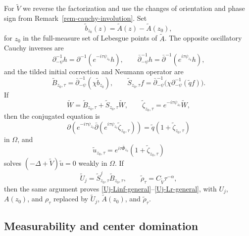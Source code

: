 \documentclass[a4paper,11pt]{article}
\theoremstyle{plain}
\theoremstyle{definition}
\theoremstyle{remark}
\begin{document}
For $\widetilde V$ we reverse the factorization and use the changes of orientation and phase sign from Remark~\ref{rem-cauchy-involution}.  Set
\begin{equation}
        \widetilde b_{z_0}(z)=\widetilde A(z)-\widetilde A(z_0),
\end{equation}
for $z_0$ in the full-measure set of Lebesgue points of $\widetilde A$.  The opposite oscillatory Cauchy inverses are
\begin{equation}
        \partial_{-\psi}^{-1}h=\partial^{-1}(e^{-i\tau\psi_{z_0}}h),
        \qquad
        \bar\partial_{-\psi}^{-1}h=\bar\partial^{-1}(e^{i\tau\psi_{z_0}}h),
\end{equation}
and the tilded initial correction and Neumann operator are
\begin{equation}\label{tilde-B-S-def-precise}
        \widetilde B_{z_0,\tau}=\bar\partial_{-\psi}^{-1}(\chi\widetilde b_{z_0}),
        \qquad
        \widetilde S_{z_0,\tau}f=\bar\partial_{-\psi}^{-1}\bigl(\chi\partial_{-\psi}^{-1}(\widetilde q f)\bigr).
\end{equation}
If
\begin{equation}
        \widetilde W=\widetilde B_{z_0,\tau}+\widetilde S_{z_0,\tau}\widetilde W,
        \qquad
        \widetilde\zeta_{z_0,\tau}=e^{-i\tau\psi_{z_0}}\widetilde W,
\end{equation}
then the conjugated equation is
\begin{equation}\label{tilde-conjugated-remainder-equation}
        \partial\left(e^{-i\tau\psi_{z_0}}\bar\partial(e^{i\tau\psi_{z_0}}\widetilde\zeta_{z_0,\tau})\right)
        =\widetilde q(1+\widetilde\zeta_{z_0,\tau})
\end{equation}
in $\Omega$, and
\begin{equation}
        \widetilde u_{z_0,\tau}=e^{i\tau\bar\Phi_{z_0}}(1+\widetilde\zeta_{z_0,\tau})
\end{equation}
solves $(-\Delta+\widetilde V)\widetilde u=0$ weakly in $\Omega$.  If
\begin{equation}
        \widetilde U_j=\widetilde S_{z_0,\tau}^j\widetilde B_{z_0,\tau},
        \qquad
        \widetilde\rho_\tau=C_{\widetilde V}\tau^{-\alpha},
\end{equation}
then the same argument proves \eqref{Uj-Linf-general}--\eqref{Uj-Lr-general}, with $U_j$, $A(z_0)$, and $\rho_\tau$ replaced by $\widetilde U_j$, $\widetilde A(z_0)$, and $\widetilde\rho_\tau$.


\subsection{Measurability and center domination}
\end{document}
